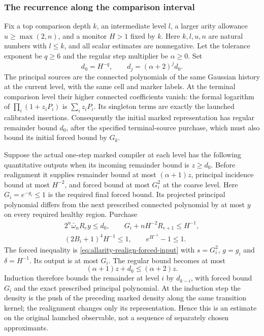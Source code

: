 \subsubsection{The recurrence along the comparison interval}

Fix a top comparison depth $k$, an intermediate level $l$, a larger
arity allowance $u\ge\max(2,n)$, and a monitor $H>1$ fixed by $k$.
Here $k,l,u,n$ are natural numbers with $l\le k$, and all scalar
estimates are nonnegative.
Let the tolerance exponent be $q\ge6$ and the regular step multiplier
be $\alpha\ge0$. Set
\[
 d_0=H^{-q},\qquad d_j=(\alpha+2)^j d_0.
\]
The principal sources are the connected polynomials of the same
Gaussian history at the current level, with the same cell and marker
labels. At the terminal comparison level their higher connected
coefficients vanish: the formal logarithm of
$\prod_i(1+z_iP_i)$ is $\sum_i z_iP_i$. Its singleton terms are
exactly the launched calibrated insertions. Consequently the initial
marked representation has regular remainder bound $d_0$, after the
specified terminal-source purchase, which must also bound its initial
forced bound by $G_k$.

Suppose the actual one-step marked compiler at each level has the
following quantitative outputs when its incoming remainder bound is
$z\ge d_0$. Before realignment it supplies remainder bound at most
$(\alpha+1)z$, principal incidence bound at most $H^{-2}$, and forced
bound at most $G_i^2$ at the coarse level. Here
$G_i=e^{-g_i}\le1$ is the required final forced bound. Its projected
principal polynomial differs from the next prescribed connected
polynomial by at most $y$ on every required healthy region. Purchase
\begin{gather}
 2^n\bar\omega_nR_e y\le d_0,\qquad
 G_i+n H^{-2}R_{e+1}\le H^{-1},\label{eq:allarity-step-purchases}\\
 (2B_i+1)^4H^{-1}\le1,\qquad e^{H^{-1}}-1\le1.
 \label{eq:allarity-step-small}
\end{gather}
The forced inequality is \eqref{eq:allarity-realign-forced-input}
with $s=G_i^2$, $g=g_i$ and $\delta=H^{-1}$. Its output is at most
$G_i$. The regular bound becomes at most
\[
       (\alpha+1)z+d_0\le(\alpha+2)z.
\]
Induction therefore bounds the remainder at level $i$ by $d_{k-i}$,
with forced bound $G_i$ and the exact prescribed principal polynomial.
At the induction step the density is the push of the preceding marked
density along the same transition kernel; the realignment changes only
its representation. Hence this is an estimate on the original launched
observable, not a sequence of separately chosen approximants.

